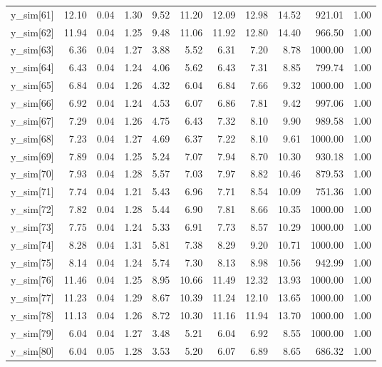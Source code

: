 \begin{table}[ht]
\begin{tabular}{rrrrrrrrrrr}
  y\_sim[61] & 12.10 & 0.04 & 1.30 & 9.52 & 11.20 & 12.09 & 12.98 & 14.52 & 921.01 & 1.00 \\ 
  y\_sim[62] & 11.94 & 0.04 & 1.25 & 9.48 & 11.06 & 11.92 & 12.80 & 14.40 & 966.50 & 1.00 \\ 
  y\_sim[63] & 6.36 & 0.04 & 1.27 & 3.88 & 5.52 & 6.31 & 7.20 & 8.78 & 1000.00 & 1.00 \\ 
  y\_sim[64] & 6.43 & 0.04 & 1.24 & 4.06 & 5.62 & 6.43 & 7.31 & 8.85 & 799.74 & 1.00 \\ 
  y\_sim[65] & 6.84 & 0.04 & 1.26 & 4.32 & 6.04 & 6.84 & 7.66 & 9.32 & 1000.00 & 1.00 \\ 
  y\_sim[66] & 6.92 & 0.04 & 1.24 & 4.53 & 6.07 & 6.86 & 7.81 & 9.42 & 997.06 & 1.00 \\ 
  y\_sim[67] & 7.29 & 0.04 & 1.26 & 4.75 & 6.43 & 7.32 & 8.10 & 9.90 & 989.58 & 1.00 \\ 
  y\_sim[68] & 7.23 & 0.04 & 1.27 & 4.69 & 6.37 & 7.22 & 8.10 & 9.61 & 1000.00 & 1.00 \\ 
  y\_sim[69] & 7.89 & 0.04 & 1.25 & 5.24 & 7.07 & 7.94 & 8.70 & 10.30 & 930.18 & 1.00 \\ 
  y\_sim[70] & 7.93 & 0.04 & 1.28 & 5.57 & 7.03 & 7.97 & 8.82 & 10.46 & 879.53 & 1.00 \\ 
  y\_sim[71] & 7.74 & 0.04 & 1.21 & 5.43 & 6.96 & 7.71 & 8.54 & 10.09 & 751.36 & 1.00 \\ 
  y\_sim[72] & 7.82 & 0.04 & 1.28 & 5.44 & 6.90 & 7.81 & 8.66 & 10.35 & 1000.00 & 1.00 \\ 
  y\_sim[73] & 7.75 & 0.04 & 1.24 & 5.33 & 6.91 & 7.73 & 8.57 & 10.29 & 1000.00 & 1.00 \\ 
  y\_sim[74] & 8.28 & 0.04 & 1.31 & 5.81 & 7.38 & 8.29 & 9.20 & 10.71 & 1000.00 & 1.00 \\ 
  y\_sim[75] & 8.14 & 0.04 & 1.24 & 5.74 & 7.30 & 8.13 & 8.98 & 10.56 & 942.99 & 1.00 \\ 
  y\_sim[76] & 11.46 & 0.04 & 1.25 & 8.95 & 10.66 & 11.49 & 12.32 & 13.93 & 1000.00 & 1.00 \\ 
  y\_sim[77] & 11.23 & 0.04 & 1.29 & 8.67 & 10.39 & 11.24 & 12.10 & 13.65 & 1000.00 & 1.00 \\ 
  y\_sim[78] & 11.13 & 0.04 & 1.26 & 8.72 & 10.30 & 11.16 & 11.94 & 13.70 & 1000.00 & 1.00 \\ 
  y\_sim[79] & 6.04 & 0.04 & 1.27 & 3.48 & 5.21 & 6.04 & 6.92 & 8.55 & 1000.00 & 1.00 \\ 
  y\_sim[80] & 6.04 & 0.05 & 1.28 & 3.53 & 5.20 & 6.07 & 6.89 & 8.65 & 686.32 & 1.00 \\ 

\end{tabular}
\end{table}
